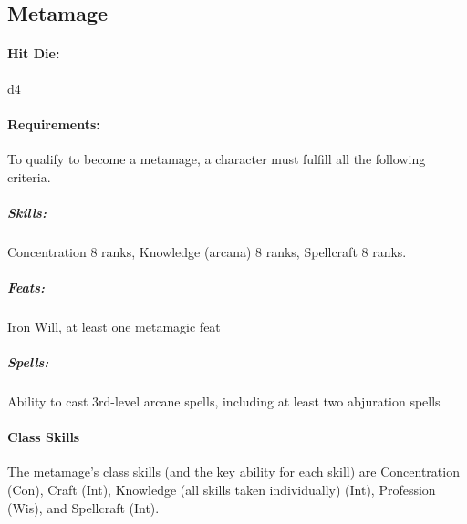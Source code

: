 \subsection{Metamage}
\paragraph{Hit Die:} d4\\
\paragraph{Requirements:}
To qualify to become a metamage, a character must fulfill all the following criteria.

\subparagraph{Skills:} 
Concentration 8 ranks, Knowledge (arcana) 8 ranks, Spellcraft 8 ranks.
\subparagraph{Feats:} 
Iron Will, at least one metamagic feat
\subparagraph{Spells:} 
Ability to cast 3rd-level arcane spells, including at least two abjuration spells

\paragraph{Class Skills}

The metamage's class skills (and the key ability for each skill) are Concentration (Con), Craft (Int), Knowledge (all skills taken individually) (Int), Profession (Wis), and Spellcraft (Int). 

